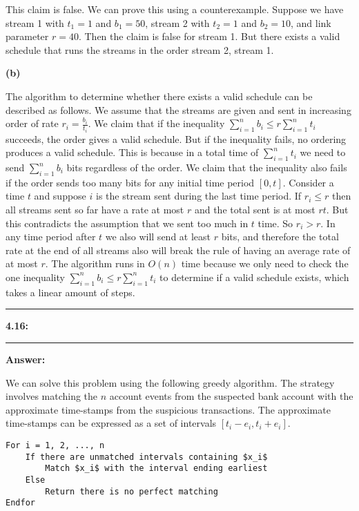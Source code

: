 \documentclass[11pt]{article}
\newcommand\question[2]{\vspace{.25in}\hrule\textbf{#1: #2}\vspace{.5em}\hrule\vspace{.10in}}
\renewcommand\part[1]{\vspace{.10in}\textbf{(#1)}}
\newcommand\answer{\vspace{.10in}\textbf{Answer: }}
\begin{document}
This claim is false. We can prove this using a counterexample. Suppose we have stream 1 with $t_1 = 1$ and $b_1 = 50$, stream 2 with $t_2 = 1$ and $b_2 = 10$, and link parameter $r = 40$. Then the claim is false for stream 1. But there exists a valid schedule that runs the streams in the order stream 2, stream 1.

\part{b}

The algorithm to determine whether there exists a valid schedule can be described as follows. We assume that the streams are given and sent in increasing order of rate $r_i = \frac{b_i}{t_i}$. We claim that if the inequality $\sum_{i = 1}^{n} b_i \leq r \sum_{i = 1}^{n} t_i$ succeeds, the order gives a valid schedule. But if the inequality fails, no ordering produces a valid schedule. This is because in a total time of $\sum_{i = 1}^{n} t_i$ we need to send $\sum_{i = 1}^{n} b_i$ bits regardless of the order. We claim that the inequality also fails if the order sends too many bits for any initial time period $[0, t]$. Consider a time $t$ and suppose $i$ is the stream sent during the last time period. If $r_i \leq r$ then all streams sent so far have a rate at most $r$ and the total sent is at most $rt$. But this contradicts the assumption that we sent too much in $t$ time. So $r_i > r$. In any time period after $t$ we also will send at least $r$ bits, and therefore the total rate at the end of all streams also will break the rule of having an average rate of at most $r$. The algorithm runs in $O(n)$ time because we only need to check the one inequality $\sum_{i = 1}^{n} b_i \leq r \sum_{i = 1}^{n} t_i$ to determine if a valid schedule exists, which takes a linear amount of steps.

\clearpage

\question{4.16}{}

\answer

We can solve this problem using the following greedy algorithm. The strategy involves matching the $n$ account events from the suspected bank account with the approximate time-stamps from the suspicious transactions. The approximate time-stamps can be expressed as a set of intervals $[t_i - e_i, t_i + e_i]$.

\begin{lstlisting}
For i = 1, 2, ..., n
    If there are unmatched intervals containing $x_i$
        Match $x_i$ with the interval ending earliest
    Else 
        Return there is no perfect matching
Endfor
\end{lstlisting}
\end{document}
